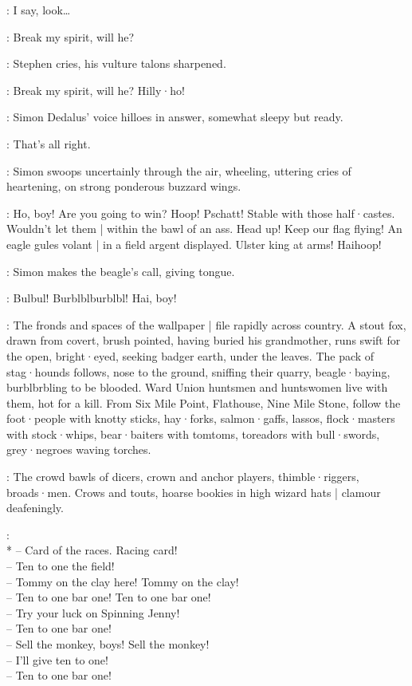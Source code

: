 \Bloom:
I say,
look…

\Stephen:
Break my spirit,
will he?
%

:
Stephen cries,
his vulture talons sharpened.

\Stephen:
Break my spirit,
will he?
Hilly·ho!

:
Simon Dedalus' voice hilloes in answer,
somewhat sleepy but ready.

\Simon:
That's all right.

:
Simon swoops uncertainly through the air,
wheeling,
uttering cries of heartening,
on strong ponderous buzzard wings.

\Simon:
Ho,
boy!
Are you going to win?
Hoop!
Pschatt!
Stable with those half·castes.
Wouldn't let them |
within the bawl of an ass.
Head up!
Keep our flag flying!
An eagle gules volant |
in a field argent displayed.
Ulster king at arms!
Haihoop!

:
Simon makes the beagle's call,
giving tongue.

\Simon:
Bulbul!
Burblblburblbl!
Hai,
boy!

:
The fronds and spaces of the wallpaper |
file rapidly across country.
A stout fox,
drawn from covert,
brush pointed,
having buried his grandmother,
runs swift for the open,
bright·eyed,
seeking badger earth,
under the leaves.
The pack of stag·hounds follows,
nose to the ground,
sniffing their quarry,
beagle·baying,
burblbrbling to be blooded.
Ward Union huntsmen and huntswomen live with them,
hot for a kill.
From Six Mile Point,
Flathouse,
Nine Mile Stone,
follow the foot·people with knotty sticks,
hay·forks,
salmon·gaffs,
lassos,
flock·masters with stock·whips,
bear·baiters with tomtoms,
toreadors with bull·swords,
grey·negroes waving torches.

:
The crowd bawls of dicers,
crown and anchor players,
thimble·riggers,
broads·men.
Crows and touts,
hoarse bookies in high wizard hats |
clamour deafeningly.

\Crowd:\\*
-- Card of the races. Racing card!\\
-- Ten to one the field!\\
-- Tommy on the clay here! Tommy on the clay!\\
-- Ten to one bar one! Ten to one bar one!\\
-- Try your luck on Spinning Jenny!\\
-- Ten to one bar one!%
\\
-- Sell the monkey, boys! Sell the monkey!\\
-- I'll give ten to one!\\
-- Ten to one bar one!

